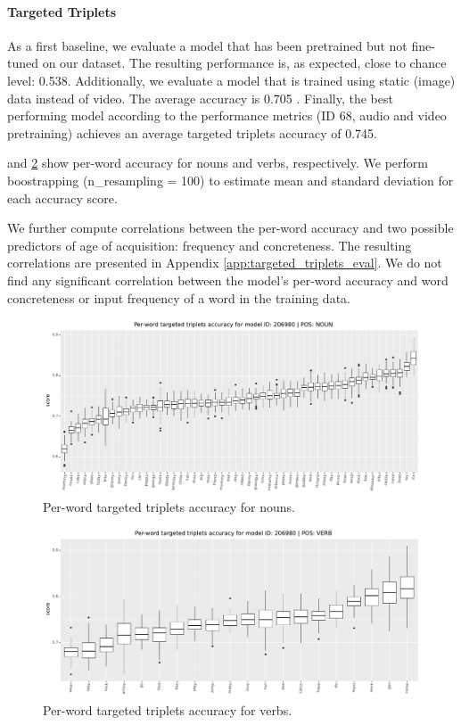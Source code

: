 \paragraph{Targeted Triplets}
As a first baseline, we evaluate a model that has been pretrained but not fine-tuned on our dataset. The resulting performance is, as expected, close to chance level: 0.538. Additionally, we evaluate a model that is trained using static (image) data instead of video. The average accuracy is 0.705 . Finally, the best performing model according to the
performance metrics (ID 68, audio and video pretraining) achieves an average
targeted triplets accuracy of 0.745.

 and
\ref{fig:accuracy_targeted_triplets_verbs} show per-word
accuracy for nouns and verbs, respectively. We perform boostrapping (n\_resampling = 100) to estimate mean and standard deviation for each accuracy score.

We further compute correlations between the per-word accuracy and two possible predictors of age of acquisition: frequency and concreteness. The resulting correlations are presented in Appendix \ref{app:targeted_triplets_eval}. We do not find any significant correlation between the model's per-word accuracy and word concreteness or input frequency of a word in the training data.




\begin{figure}
  \centering
  \includegraphics[width=\textwidth]{results/targeted_triplets/results_per_word_version_206980_NOUN.pdf}
  \caption{Per-word targeted triplets accuracy for nouns.}
  \label{fig:accuracy_targeted_triplets_nouns}
\end{figure}

\begin{figure}
  \centering
  \includegraphics[width=\textwidth]{results/targeted_triplets/results_per_word_version_206980_VERB.pdf}
  \caption{Per-word targeted triplets accuracy for verbs.}
  \label{fig:accuracy_targeted_triplets_verbs}
\end{figure}
